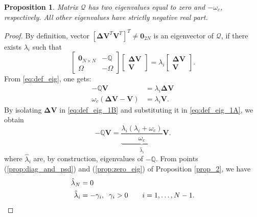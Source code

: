 \documentclass[a4paper]{article}
\theoremstyle{plain}
\newtheorem{prp}{Proposition}
\newcommand{\Qset}{\mathbb{Q}}
\begin{document}
\begin{prp}
	\label{prop:eig_Qcall}
	Matrix $\mathcal{Q}$ has two eigenvalues equal to zero and $-\omega_c$, respectively. All other eigenvalues have strictly negative real part.
\end{prp}
\begin{proof}
	By definition, vector $[\mathbf{{\Delta V}}^T \mathbf{{V}}^T]^T\neq\mathbf{0}_{2N}$ is an eigenvector of $\mathcal{Q}$, if there exists $\lambda_i$ such that 
	\begin{equation}
	\label{eq:def_eig}
	\begin{bmatrix}
	\mathbf{0}_{N\times N} & -\Qset\\
	\Omega & -\Omega 
	\end{bmatrix}\begin{bmatrix}
	\mathbf{{\Delta V}}\\
	\mathbf{{V}}                 \end{bmatrix} = \lambda_i \begin{bmatrix}
	\mathbf{{\Delta V}}\\
	\mathbf{{V}}                 \end{bmatrix}.
	\end{equation}
	From \eqref{eq:def_eig}, one gets:
	\begin{subequations}
		\begin{align}
		\label{eq:def_eig_1A}
		-\mathbb{Q}\mathbf{{V}}&= \lambda_i\mathbf{{\Delta V}}\\
		\label{eq:def_eig_1B}
		\omega_c (\mathbf{{\Delta V}}-\mathbf{{V}}) &= \lambda_i {\mathbf{V}}.\end{align}
	\end{subequations}
	By isolating $\mathbf{{\Delta V}}$ in \eqref{eq:def_eig_1B} and substituting it in \eqref{eq:def_eig_1A}, we obtain
	\begin{equation}
	\label{eq:lambda_hat}
	-\mathbb{Q}{\mathbf{ V}} =\underbrace{ \frac{\lambda_i(\lambda_i+\omega_c)}{\omega_c}}_{\widehat \lambda_i}\mathbf{ V}.
	\end{equation}
	where $\hat\lambda_i$ are, by construction, eigenvalues of $-\mathbb{Q}$. From points (\ref{prop:diag_and_psd}) and (\ref{prop:zero_eig}) of Proposition \ref{prop_2}, we have 
	\begin{subequations}
		\begin{align}
		\label{eq:def_eig_hat_lambda_1}
		\hat\lambda_N &= 0\\
		\label{eq:def_eig_hat_lambda_2}
		\hat\lambda_i &=-\gamma_i,\hspace{2mm}\gamma_i>0\hspace{7mm}i = 1,\dots,N-1.\end{align}

\end{subequations}
\end{proof}
\end{document}
